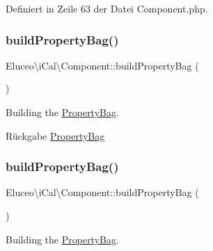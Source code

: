 Definiert in Zeile 63 der Datei Component.\+php.

\mbox{\label{class_eluceo_1_1i_cal_1_1_component_a07ad9d3af0984b1299433a37b30c6608}} 
\subsubsection{\texorpdfstring{build\+Property\+Bag()}{buildPropertyBag()}\hspace{0.1cm}{\footnotesize\ttfamily [1/3]}}
{\footnotesize\ttfamily Eluceo\textbackslash{}i\+Cal\textbackslash{}\+Component\+::build\+Property\+Bag (\begin{DoxyParamCaption}{ }\end{DoxyParamCaption})\hspace{0.3cm}{\ttfamily [abstract]}}

Building the \mbox{\hyperlink{class_eluceo_1_1i_cal_1_1_property_bag}{Property\+Bag}}.

\begin{DoxyReturn}{Rückgabe}
\mbox{\hyperlink{class_eluceo_1_1i_cal_1_1_property_bag}{Property\+Bag}} 
\end{DoxyReturn}
\mbox{\label{class_eluceo_1_1i_cal_1_1_component_a07ad9d3af0984b1299433a37b30c6608}} 
\subsubsection{\texorpdfstring{build\+Property\+Bag()}{buildPropertyBag()}\hspace{0.1cm}{\footnotesize\ttfamily [2/3]}}
{\footnotesize\ttfamily Eluceo\textbackslash{}i\+Cal\textbackslash{}\+Component\+::build\+Property\+Bag (\begin{DoxyParamCaption}{ }\end{DoxyParamCaption})\hspace{0.3cm}{\ttfamily [abstract]}}

Building the \mbox{\hyperlink{class_eluceo_1_1i_cal_1_1_property_bag}{Property\+Bag}}.

